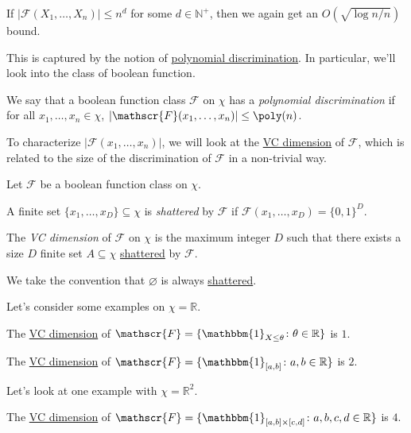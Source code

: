 \begin{remark}
	If \(\vert \mathscr{F} (X_1, \dots , X_n) \vert \leq n^d\) for some \(d\in \mathbb{N}^+ \), then we again get an \(O(\sqrt{\log n / n} )\) bound.
\end{remark}

This is captured by the notion of \hyperref[def:polynomial-discrimination]{polynomial discrimination}. In particular, we'll look into the class of boolean function.

\begin{definition}\label{def:polynomial-discrimination}
	We say that a boolean function class \(\mathscr{F} \) on \(\chi \) has a \emph{polynomial discrimination} if for all \(x_1, \dots , x_n\in \chi \), \(\left\vert \mathscr{F} (x_1, \dots , x_n) \right\vert \leq \poly(n)\).
\end{definition}

To characterize \(\vert \mathscr{F} (x_1, \dots , x_n) \vert \), we will look at the \hyperref[def:VC-dimension]{VC dimension} of \(\mathscr{F} \), which is related to the size of the discrimination of \(\mathscr{F} \) in a non-trivial way.

\begin{definition*}
	Let \(\mathscr{F} \) be a boolean function class on \(\chi \).
	\begin{definition}[Shatter]\label{def:shatter}
		A finite set \(\{ x_1, \dots , x_D \} \subseteq \chi \) is \emph{shattered} by \(\mathscr{F} \) if \(\mathscr{F} (x_1, \dots , x_D) = \{ 0, 1 \} ^D\).
	\end{definition}

	\begin{definition}\label{def:VC-dimension}
		The \emph{VC dimension} of \(\mathscr{F} \) on \(\chi \) is the maximum integer \(D\) such that there exists a size \(D\) finite set \(A \subseteq \chi \) \hyperref[def:shatter]{shattered} by \(\mathscr{F} \).
	\end{definition}
\end{definition*}


\begin{remark}
	We take the convention that \(\varnothing \) is always \hyperref[def:shatter]{shattered}.
\end{remark}

Let's consider some examples on \(\chi = \mathbb{R} \).

\begin{eg}
	The \hyperref[def:VC-dimension]{VC dimension} of \(\mathscr{F} = \{ \mathbbm{1}_{X \leq \theta } \colon \theta \in \mathbb{R} \} \) is \(1\).
\end{eg}

\begin{eg}
	The \hyperref[def:VC-dimension]{VC dimension} of \(\mathscr{F} = \{ \mathbbm{1}_{[a, b]} \colon a, b \in \mathbb{R}  \} \) is \(2\).
\end{eg}

Let's look at one example with \(\chi = \mathbb{R} ^2\).
\begin{eg}
	The \hyperref[def:VC-dimension]{VC dimension} of \(\mathscr{F} = \{ \mathbbm{1}_{[a, b]\times [c, d]} \colon a, b , c, d\in \mathbb{R} \} \) is \(4\).
\end{eg}